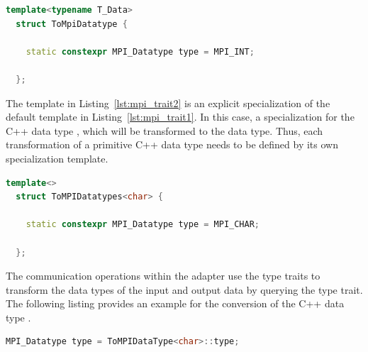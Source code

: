 \begin{minipage}[t]{\textwidth} 
\begin{lstlisting}[language=C++, label=lst:mpi_trait1, caption={A templated struct defines the default behavior of the type trait. It will transform arbitrary data types \cpp{T\_Data} to the \cpp{MPI\_INT} data type if no other type trait is defined}]
  template<typename T_Data> 
  struct ToMpiDatatype { 

    static constexpr MPI_Datatype type = MPI_INT; 

  };
\end{lstlisting}
\end{minipage}

\noindent The template in Listing~\ref{lst:mpi_trait2} is an explicit
specialization of the default template in
Listing~\ref{lst:mpi_trait1}. In this case, a specialization for the
C++ data type , which will be transformed to the
 data type.  Thus, each transformation of a primitive
C++ data type needs to be defined by its own specialization template.

\begin{minipage}[t]{\textwidth} 
  \begin{lstlisting}[language=C++, label=lst:mpi_trait2, caption={A specialization of the default type trait for the C++ data type \cpp{char}. It transforms the C++ data type \cpp{char} to the \cpp{MPI\_CHAR} data type of MPI.}]
  template<>
  struct ToMPIDatatypes<char> { 

    static constexpr MPI_Datatype type = MPI_CHAR; 

  };
\end{lstlisting}
\end{minipage}

\noindent The communication operations within the adapter use the
type traits to transform the data types of the input and output data
by querying the type trait. The following listing provides an example
for the conversion of the C++ data type .

\begin{minipage}[t]{\textwidth} 
\begin{lstlisting}[language=C++, label=lst:mpi_trait3]
  MPI_Datatype type = ToMPIDataType<char>::type;
\end{lstlisting}
\end{minipage}

